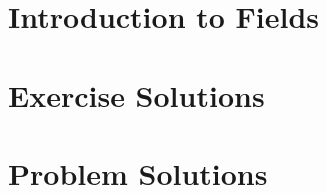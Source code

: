 
\usepackage{xr}

\newcommand{\version}{0.1}
\newcommand{\volumenumber}{3}
\newcommand{\volumename}{Fields}
\newcommand{\volumeimage}{cover/Regular Heptagon.png}

\linespread{1.05}



\newcommand{\quotepagetext}{
    I became convinced that studying the algebraic relationship of numbers is most conveniently based on a concept that is directly connected with the simplest arithmetic properties. I had originally used the term ``rational domain'', which I later changed to ``field''.
}
\newcommand{\quotepageattribution}{Richard Dedekind, 1871}
\newcommand{\quotepagecitation}{\cite[p.~66]{kleiner_2007}}

\newcommand{\prefacevolumetext}{
    We cover field theory essentials in Volume III. %
}
\newcommand{\prefacevolumedate}{}  %

\newcommand{\interdependencenotes}{
    \begin{itemize}
        \item Number 1
        \item number 2
        \item 3
    \end{itemize}
}


\frontmatterpages  %

\chapter{Introduction to Fields}

\appendix
\chapter{Exercise Solutions}

\chapter{Problem Solutions}

